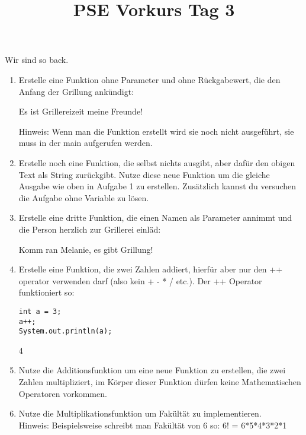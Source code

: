 \documentclass{../../sheet}
\title{PSE Vorkurs Tag 3}
\begin{document}
\maketitle
Wir sind so back.

\newpage


\begin{enumerate}
    \item Erstelle eine Funktion ohne Parameter und ohne Rückgabewert, die den Anfang der Grillung ankündigt:
    \begin{ausgabe}
Es ist Grillereizeit meine Freunde!
    \end{ausgabe}
    Hinweis: Wenn man die Funktion erstellt wird sie noch nicht ausgeführt, sie muss in der main aufgerufen werden.
    \item Erstelle noch eine Funktion, die selbst nichts ausgibt, aber dafür den obigen Text als String zurückgibt. Nutze diese neue Funktion um die gleiche Ausgabe wie oben in Aufgabe 1 zu erstellen. Zusätzlich kannst du versuchen die Aufgabe ohne Variable zu lösen.
    \item Erstelle eine dritte Funktion, die einen Namen als Parameter annimmt und die Person herzlich zur Grillerei einläd:
    \begin{ausgabe}
Komm ran Melanie, es gibt Grillung!
    \end{ausgabe}
    \item Erstelle eine Funktion, die zwei Zahlen addiert, hierfür aber nur den ++ operator verwenden darf (also kein + - * / etc.). Der ++ Operator funktioniert so:
    \begin{verbatim}
int a = 3;
a++;
System.out.println(a);
    \end{verbatim}
    \begin{ausgabe}
        4
    \end{ausgabe}
    \item Nutze die Additionsfunktion um eine neue Funktion zu erstellen, die zwei Zahlen multipliziert, im Körper dieser Funktion dürfen keine Mathematischen Operatoren vorkommen.
    \item Nutze die Multiplikationsfunktion um Fakültät zu implementieren.\\
    Hinweis: Beispielsweise schreibt man Fakültät von 6 so: 6! = 6*5*4*3*2*1
\end{enumerate}

\newpage
{}
\end{document}
